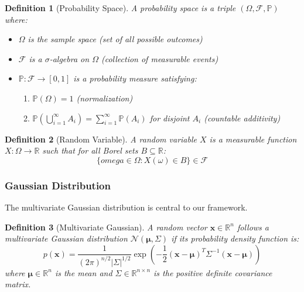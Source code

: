 \documentclass[11pt]{article}
\newtheorem{definition}{Definition}[section]
\begin{document}
\begin{definition}[Probability Space]
A probability space is a triple $(\Omega, \mathcal{F}, \mathbb{P})$ where:
\begin{itemize}
\item $\Omega$ is the sample space (set of all possible outcomes)
\item $\mathcal{F}$ is a $\sigma$-algebra on $\Omega$ (collection of measurable events)
\item $\mathbb{P}: \mathcal{F} \to [0,1]$ is a probability measure satisfying:
\begin{enumerate}
\item $\mathbb{P}(\Omega) = 1$ (normalization)
\item $\mathbb{P}(\bigcup_{i=1}^\infty A_i) = \sum_{i=1}^\infty \mathbb{P}(A_i)$ for disjoint $A_i$ (countable additivity)
\end{enumerate}
\end{itemize}
\end{definition}

\begin{definition}[Random Variable]
A random variable $X$ is a measurable function $X: \Omega \to \mathbb{R}$ such that for all Borel sets $B \subseteq \mathbb{R}$:
\begin{equation}
\{omega \in \Omega : X(\omega) \in B\} \in \mathcal{F}
\end{equation}
\end{definition}

\subsubsection{Gaussian Distribution}

The multivariate Gaussian distribution is central to our framework.

\begin{definition}[Multivariate Gaussian]
A random vector $\mathbf{x} \in \mathbb{R}^n$ follows a multivariate Gaussian distribution $\mathcal{N}(\bm{\mu}, \Sigma)$ if its probability density function is:
\begin{equation}
p(\mathbf{x}) = \frac{1}{(2\pi)^{n/2}|\Sigma|^{1/2}} \exp\left(-\frac{1}{2}(\mathbf{x} - \bm{\mu})^T \Sigma^{-1} (\mathbf{x} - \bm{\mu})\right)
\end{equation}
where $\bm{\mu} \in \mathbb{R}^n$ is the mean and $\Sigma \in \mathbb{R}^{n \times n}$ is the positive definite covariance matrix.
\end{definition}
\end{document}
